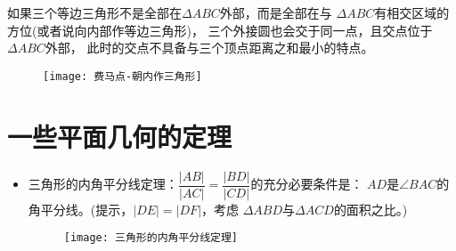 \begin{itemize}[leftmargin=\inteval{\myitemleftmargin}pt,itemsep=
   \inteval{\myitemitempsep}pt,topsep=\inteval{\myitemtopsep}pt]
如果三个等边三角形不是全部在$ \Delta ABC $外部，而是全部在与
$ \Delta ABC $有相交区域的方位(或者说向内部作等边三角形)，
三个外接圆也会交于同一点，且交点位于$ \Delta ABC $外部，
此时的交点不具备与三个顶点距离之和最小的特点。
\begin{figure}[!h]
    \centering
    \texttt{[image: 费马点-朝内作三角形]}
\end{figure}
\newpage

\end{itemize}

\section{一些平面几何的定理}
\begin{itemize}[leftmargin=\inteval{\myitemleftmargin}pt,itemsep=
   \inteval{\myitemitempsep}pt,topsep=\inteval{\myitemtopsep}pt]
\item 三角形的内角平分线定理：$ \dfrac{|AB|}{|AC|}=
\dfrac{|BD|}{|CD|} $的充分必要条件是：
$ AD $是$ \angle BAC $的角平分线。(提示，$ |DE|=|DF| $，考虑
$ \Delta ABD $与$ \Delta ACD $的面积之比。)
\begin{figure}[!h]
    \centering
    \texttt{[image: 三角形的内角平分线定理]}
\end{figure} 


\end{itemize}
